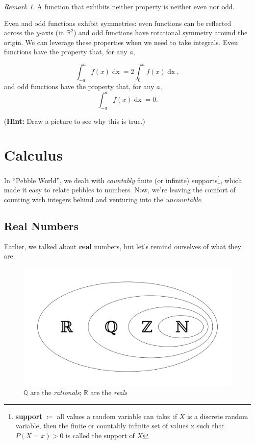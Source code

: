 \documentclass[12pt,english]{scrartcl}
\newcommand{\R}{\mathbb{R}}
\theoremstyle{definition}
\theoremstyle{remark}
\newtheorem*{remark}{Remark}
\begin{document}
\begin{remark}
    A function that exhibits neither property is neither even nor odd.
\end{remark}

Even and odd functions exhibit symmetries: even functions can be reflected
across the $y$-axis (in $\R^{2}$) and odd functions have rotational
symmetry around the origin. We can leverage these properties when we need to
take integrals. Even functions have the property that, for any $a$,

\[
    \int_{-a}^{a} f(x) \mathop{dx} = 2 \int_{0}^{a} f(x) \mathop{dx}
,\] and odd functions have the property that, for any $a$, \[
\int_{-a}^{a} f(x) \mathop{dx} = 0
.\]

\noindent(\textbf{Hint:} Draw a picture to see why this is true.)

\section{Calculus}%
\label{sec:calculus}

In ``Pebble World'', we dealt with \textit{countably} finite (or infinite)
supports\footnote{
    \textbf{support} $\coloneqq$ all values a random variable can
    take; if $X$ is a discrete random variable, then the finite or countably
    infinite set of values x such that $P(X = x) > 0$ is called the support of $X$
}, which made it easy to relate pebbles to numbers. Now, we're
leaving the comfort of counting with integers behind and venturing into the
\textit{uncountable}.

\subsection{Real Numbers}%
\label{sub:real_numbers}

Earlier, we talked about \textbf{real} numbers, but let's remind ourselves of
what they are.

\begin{figure}[ht]
    \centering
    \includegraphics[width=0.5\linewidth]{number-systems}
    \caption{$\mathbb{Q}$ are the \textit{rationals}; $\mathbb{R}$ are the \textit{reals} }
    \label{fig:number-systems}
\end{figure}
\end{document}
